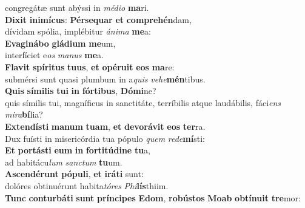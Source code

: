 \evenverse congregátæ sunt abýssi in \textit{mé}\textit{di}\textit{o} \textbf{ma}ri.\\
\oddverse \textbf{Di}\textbf{xit} \textbf{i}\textbf{ni}\textbf{mí}\textbf{cus}: \textbf{Pér}\textbf{se}\textbf{quar} \textbf{et} \textbf{com}\textbf{pre}\textbf{hén}dam,~\*\\
\oddverse dívidam spólia, implébitur \textit{á}\textit{ni}\textit{ma} \textbf{me}a:\\
\evenverse \textbf{E}\textbf{va}\textbf{gi}\textbf{ná}\textbf{bo} \textbf{glá}\textbf{di}\textbf{um} \textbf{me}um,~\*\\
\evenverse interfíciet e\textit{os} \textit{ma}\textit{nus} \textbf{me}a.\\
\oddverse \textbf{Fla}\textbf{vit} \textbf{spí}\textbf{ri}\textbf{tus} \textbf{tu}\textbf{us}, \textbf{et} \textbf{o}\textbf{pé}\textbf{ru}\textbf{it} \textbf{e}\textbf{os} \textbf{ma}re:~\*\\
\oddverse submérsi sunt quasi plumbum in a\textit{quis} \textit{ve}\textit{he}\textbf{mén}tibus.\\
\evenverse \textbf{Quis} \textbf{sí}\textbf{mi}\textbf{lis} \textbf{tu}\textbf{i} \textbf{in} \textbf{fór}\textbf{ti}\textbf{bus}, \textbf{Dó}\textbf{mi}ne?~\*\\
\evenverse quis símilis tui, magníficus in sanctitáte, terríbilis atque laudábilis, fáci\textit{ens} \textit{mi}\textit{ra}\textbf{bí}lia?\\
\oddverse \textbf{Ex}\textbf{ten}\textbf{dí}\textbf{sti} \textbf{ma}\textbf{num} \textbf{tu}\textbf{am}, \textbf{et} \textbf{de}\textbf{vo}\textbf{rá}\textbf{vit} \textbf{e}\textbf{os} \textbf{ter}ra.~\*\\
\oddverse Dux fuísti in misericórdia tua pópulo \textit{quem} \textit{re}\textit{de}\textbf{mí}sti:\\
\evenverse \textbf{Et} \textbf{por}\textbf{tá}\textbf{sti} \textbf{e}\textbf{um} \textbf{in} \textbf{for}\textbf{ti}\textbf{tú}\textbf{di}\textbf{ne} \textbf{tu}a,~\*\\
\evenverse ad habitácu\textit{lum} \textit{san}\textit{ctum} \textbf{tu}um.\\
\oddverse \textbf{A}\textbf{scen}\textbf{dé}\textbf{runt} \textbf{pó}\textbf{pu}\textbf{li}, \textbf{et} \textbf{i}\textbf{rá}\textbf{ti} sunt:~\*\\
\oddverse dolóres obtinuérunt habita\textit{tó}\textit{res} \textit{Phi}\textbf{lís}thiim.\\
\evenverse \textbf{Tunc} \textbf{con}\textbf{tur}\textbf{bá}\textbf{ti} \textbf{sunt} \textbf{prín}\textbf{ci}\textbf{pes} \textbf{E}\textbf{dom}, \textbf{ro}\textbf{bú}\textbf{stos} \textbf{Mo}\textbf{ab} \textbf{ob}\textbf{tí}\textbf{nu}\textbf{it} \textbf{tre}mor:~\*\\
